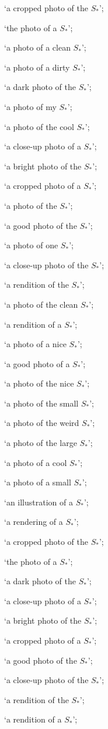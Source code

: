 `a cropped photo of the $S_*$';

`the photo of a $S_*$';

`a photo of a clean $S_*$';

`a photo of a dirty $S_*$';

`a dark photo of the $S_*$';

`a photo of my $S_*$';

`a photo of the cool $S_*$';

`a close-up photo of a $S_*$';

`a bright photo of the $S_*$';

`a cropped photo of a $S_*$';

`a photo of the $S_*$';

`a good photo of the $S_*$';
    
`a photo of one $S_*$';

`a close-up photo of the $S_*$';

`a rendition of the $S_*$';

`a photo of the clean $S_*$';

`a rendition of a $S_*$';
    
`a photo of a nice $S_*$';
    
`a good photo of a $S_*$';
    
`a photo of the nice $S_*$';
    
`a photo of the small $S_*$';
    
`a photo of the weird $S_*$';
    
`a photo of the large $S_*$';
    
`a photo of a cool $S_*$';
    
`a photo of a small $S_*$';
    
`an illustration of a $S_*$';
    
`a rendering of a $S_*$';
    
`a cropped photo of the $S_*$';
    
`the photo of a $S_*$';
    
`a dark photo of the $S_*$';
    
`a close-up photo of a $S_*$';
    
`a bright photo of the $S_*$';
    
`a cropped photo of a $S_*$';
    
`a good photo of the $S_*$';
    
`a close-up photo of the $S_*$';
    
`a rendition of the $S_*$';
    
`a rendition of a $S_*$';
    
